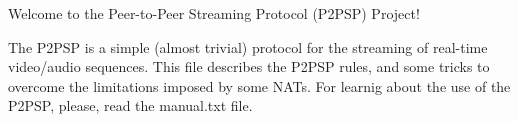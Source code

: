 Welcome to the Peer-to-Peer Streaming Protocol (P2PSP) Project!

The P2PSP is a simple (almost trivial) protocol for the streaming of
real-time video/audio sequences. This file describes the P2PSP rules,
and some tricks to overcome the limitations imposed by some NATs. For
learnig about the use of the P2PSP, please, read the manual.txt
file.
